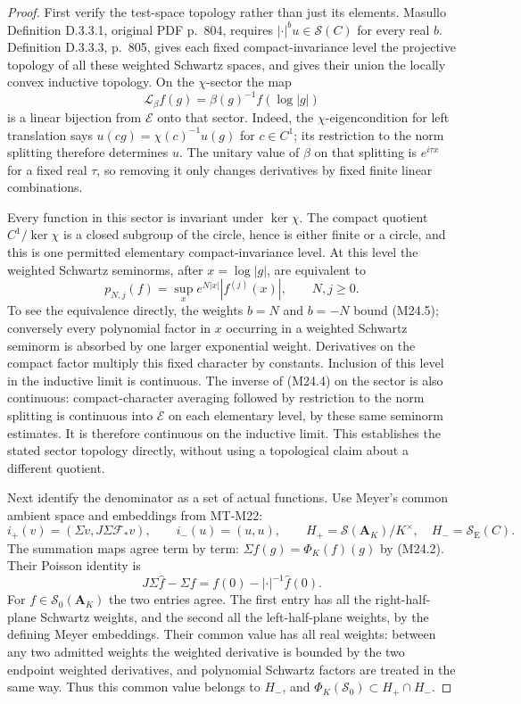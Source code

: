 \documentclass[11pt,a4paper]{article}
\begin{document}
\begin{proof}
First verify the test-space topology rather than just its elements.
Masullo Definition D.3.3.1, original PDF p.~804, requires
$|\cdot|^b u\in\mathcal S(C)$ for every real $b$.
Definition D.3.3.3, p.~805, gives each fixed compact-invariance
level the projective topology of all these weighted Schwartz spaces,
and gives their union the locally convex inductive topology.
On the $\chi$-sector the map
\[
 \mathcal L_\beta f(g)=\beta(g)^{-1}f(\log|g|)
 \tag{M24.4}
\]
is a linear bijection from $\mathcal E$ onto that sector.
Indeed, the $\chi$-eigencondition for left translation says
$u(cg)=\chi(c)^{-1}u(g)$ for $c\in C^1$; its restriction to
the norm splitting therefore determines $u$. The unitary value
of $\beta$ on that splitting is $e^{i\tau x}$ for a fixed real
$\tau$, so removing it only changes derivatives by fixed finite
linear combinations.

Every function in this sector is invariant under $\ker\chi$.
The compact quotient $C^1/\ker\chi$ is a closed subgroup of the
circle, hence is either finite or a circle, and this is one permitted
elementary compact-invariance level. At this level the weighted
Schwartz seminorms, after $x=\log|g|$, are equivalent to
\[
 p_{N,j}(f)=\sup_x e^{N|x|}|f^{(j)}(x)|,
 \qquad N,j\ge0.
 \tag{M24.5}
\]
To see the equivalence directly, the weights $b=N$ and $b=-N$
bound (M24.5); conversely every polynomial factor in $x$ occurring
in a weighted Schwartz seminorm is absorbed by one larger
exponential weight. Derivatives on the compact factor multiply
this fixed character by constants. Inclusion of this level in the
inductive limit is continuous. The inverse of (M24.4) on the
sector is also continuous: compact-character averaging followed
by restriction to the norm splitting is continuous into
$\mathcal E$ on each elementary level, by these same seminorm
estimates. It is therefore continuous on the inductive limit.
This establishes the stated sector topology directly, without
using a topological claim about a different quotient.

Next identify the denominator as a set of actual functions.
Use Meyer's common ambient space and embeddings from MT-M22:
\[
 i_+(v)=(\Sigma v,J\Sigma\mathcal F_*v),
 \qquad i_-(u)=(u,u),
 \qquad H_+=\mathcal S(\mathbf A_K)/K^\times,
 \quad H_-=\mathcal S_{\mathrm E}(C).
\]
The summation maps agree term by term:
$\Sigma f(g)=\Phi_K(f)(g)$ by (M24.2).
Their Poisson identity is
\[
 J\Sigma\widehat f-\Sigma f
      =f(0)-|\cdot|^{-1}\widehat f(0).
 \tag{M24.6}
\]
For $f\in\mathcal S_0(\mathbf A_K)$ the two entries agree.
The first entry has all the right-half-plane Schwartz weights,
and the second all the left-half-plane weights, by the defining
Meyer embeddings. Their common value has all real weights:
between any two admitted weights the weighted derivative is
bounded by the two endpoint weighted derivatives, and polynomial
Schwartz factors are treated in the same way. Thus this common
value belongs to $H_-$, and
$\Phi_K(\mathcal S_0)\subset H_+\cap H_-$.


\end{proof}
\end{document}
